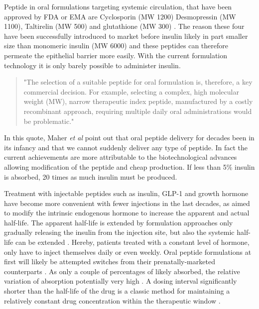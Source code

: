 Peptide \DIFdelbegin {}\DIFdelend \DIFaddbegin {}\DIFaddend in oral formulations targeting systemic circulation, that have been approved by FDA or EMA are Cyclosporin (MW 1200) Desmopressin (MW 1100), Taltirelin (MW 500) and glutathione (MW 300) \cite{aguirre2016current}. The reason these four \DIFdelbegin {}\DIFdelend \DIFaddbegin {}\DIFaddend have been successfully introduced to market before insulin \DIFdelbegin {}\DIFdelend \DIFaddbegin {}\DIFaddend likely in part \DIFdelbegin {}\DIFdelend \DIFaddbegin {}\DIFaddend smaller size than monomeric insulin (MW 6000) and these peptides can therefore permeate the epithelial barrier more easily. With the current formulation technology it is only barely possible to administer insulin.
\begin{quote}
"The selection of a suitable peptide for oral formulation is, therefore, a key commercial decision. For example, selecting a complex, high molecular weight (MW), narrow therapeutic index peptide, manufactured by a costly recombinant approach, requiring multiple daily oral administrations would be problematic."
\cite{maher2014formulation}
\end{quote}

In this quote, Maher \textit{et al} point out that oral peptide delivery for decades \DIFdelbegin {}\DIFdelend \DIFaddbegin {}\DIFaddend been in its infancy and that we cannot suddenly deliver any type of peptide. In fact the current achievements are more attributable to the biotechnological advances allowing modification of the peptide and cheap production. If less than 5\% insulin is absorbed, 20 times as much insulin must be produced.

Treatment with injectable peptides such as insulin, GLP-1 and growth hormone have become more convenient with fewer injections in the last decades, as \DIFdelbegin {}\DIFdelend \DIFaddbegin {}\DIFaddend aimed to modify the intrinsic endogenous hormone to increase the apparent and actual half-life. The apparent half-life is extended by formulation approaches only gradually releasing the insulin from the injection site, but also the systemic half-life can be extended \cite{arnolds2010pharmacokinetic}. Hereby, patients treated with a constant level of hormone, only have to inject themselves daily or even weekly. Oral peptide formulations at first will likely be attempted switches from their prenatally-marketed counterparts \cite{maher2014formulation}. As only a couple of percentages of \DIFdelbegin {}\DIFdelend \DIFaddbegin {}\DIFaddend likely absorbed, the relative variation of absorption \DIFdelbegin {}\DIFdelend \DIFaddbegin {}\DIFaddend potentially very high \cite{gabor2010improving}. A dosing interval significantly shorter than the half-life of the drug is a classic method for maintaining a relatively constant drug concentration within the therapeutic window \cite{tozer2006introduction}.

